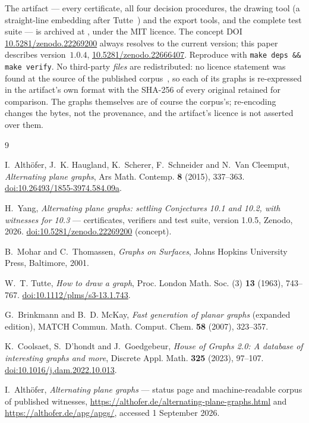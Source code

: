\documentclass[11pt,a4paper]{amsart}
\theoremstyle{plain}
\theoremstyle{definition}
\begin{document}
The artifact --- every certificate, all four decision procedures, the drawing
tool (a straight-line embedding after Tutte~\cite{Tutte1963}) and the export
tools, and the complete test suite --- is archived at
\cite{artifact}, under the MIT licence. The concept DOI
\href{https://doi.org/10.5281/zenodo.22269200}{10.5281/zenodo.22269200} always
resolves to the current version; this paper describes version~$1.0.4$,
\href{https://doi.org/10.5281/zenodo.22666407}{10.5281/zenodo.22666407}.
Reproduce with \texttt{make deps \&\& make verify}. No third-party \emph{files}
are redistributed: no licence statement was found at the source of the published
corpus~\cite{APGcorpus}, so each of its graphs is re-expressed in the artifact's
own format with the SHA-256 of every original retained for comparison. The
graphs themselves are of course the corpus's; re-encoding changes the bytes, not
the provenance, and the artifact's licence is not asserted over them.

\begin{thebibliography}{9}

I.~Alth\"ofer, J.~K. Haugland, K.~Scherer, F.~Schneider and N.~Van Cleemput,
\emph{Alternating plane graphs},
Ars Math. Contemp. \textbf{8} (2015), 337--363.
\href{https://doi.org/10.26493/1855-3974.584.09a}{doi:10.26493/1855-3974.584.09a}.

H.~Yang, \emph{Alternating plane graphs: settling Conjectures 10.1 and 10.2,
with witnesses for 10.3} --- certificates, verifiers and test suite, version 1.0.5, Zenodo, 2026.
\href{https://doi.org/10.5281/zenodo.22269200}{doi:10.5281/zenodo.22269200}
(concept).

B.~Mohar and C.~Thomassen, \emph{Graphs on Surfaces},
Johns Hopkins University Press, Baltimore, 2001.

W.~T. Tutte, \emph{How to draw a graph},
Proc. London Math. Soc. (3) \textbf{13} (1963), 743--767.
\href{https://doi.org/10.1112/plms/s3-13.1.743}{doi:10.1112/plms/s3-13.1.743}.

G.~Brinkmann and B.~D. McKay,
\emph{Fast generation of planar graphs} (expanded edition),
MATCH Commun. Math. Comput. Chem. \textbf{58} (2007), 323--357.

K.~Coolsaet, S.~D'hondt and J.~Goedgebeur,
\emph{House of Graphs 2.0: A database of interesting graphs and more},
Discrete Appl. Math. \textbf{325} (2023), 97--107.
\href{https://doi.org/10.1016/j.dam.2022.10.013}{doi:10.1016/j.dam.2022.10.013}.

I.~Alth\"ofer, \emph{Alternating plane graphs} --- status page and
machine-readable corpus of published witnesses,
\url{https://althofer.de/alternating-plane-graphs.html} and
\url{https://althofer.de/apg/apgs/}, accessed 1 September 2026.

\end{thebibliography}
\end{document}
